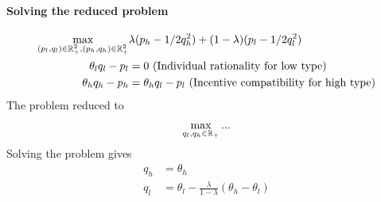 \documentclass{article}
\begin{document}
   	\paragraph{Solving the reduced problem}
   	\begin{align}
   		\max_{(p_l, q_l) \in \mathbb{R}^2_+, (p_h, q_h) \in \mathbb{R}^2_+} &\lambda (p_h - 1/2 q_h^2) + (1 - \lambda) (p_l - 1/2 q_l^2) \\
   		\theta_l q_l - p_l &= 0 \text{{ (Individual rationality for low type)}} \\
   		\theta_h q_h - p_h &= \theta_h q_l - p_l \text{{ (Incentive compatibility for high type)}}
   	\end{align}
   	The problem reduced to
   	\begin{align}
   		\max_{q_l, q_h \in \mathbb{R}_+} ...
   	\end{align}
   	Solving the problem gives
   	\begin{align}
   		q_h &= \theta_h \\
   		q_l &= \theta_l - \frac{\lambda}{1 - \lambda}(\theta_h - \theta_l)
   	\end{align}
\end{document}
